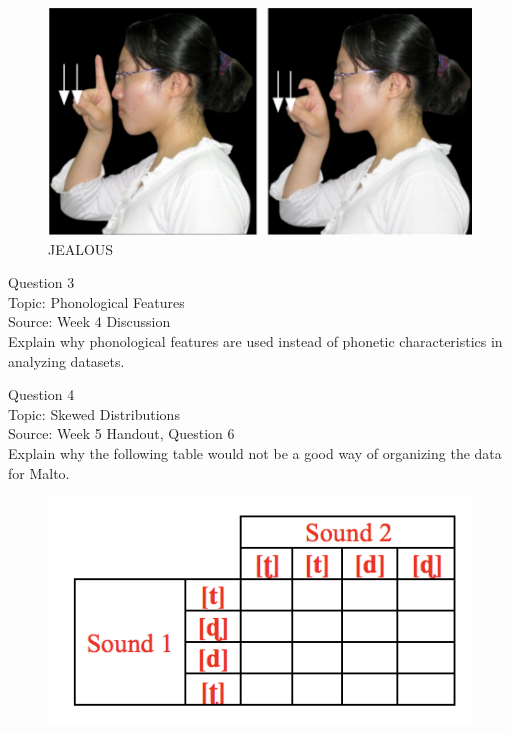 \documentclass[12pt]{article}
\begin{document}
\begin{figure}[H]
\includegraphics{../images/taiwansign_jealous.png}
\caption{JEALOUS}
\end{figure}

\newpage

{\large Question 3}\\

Topic: Phonological Features\\
Source: Week 4 Discussion\\

Explain why phonological features are used instead of phonetic characteristics in analyzing datasets.\\


\newpage

{\large Question 4}\\

Topic: Skewed Distributions\\
Source: Week 5 Handout, Question 6\\

Explain why the following table would not be a good way of organizing the data for Malto.\\

\begin{figure}[H]
\includegraphics{../images/Malto_table_bad.png}
\end{figure}
\end{document}
